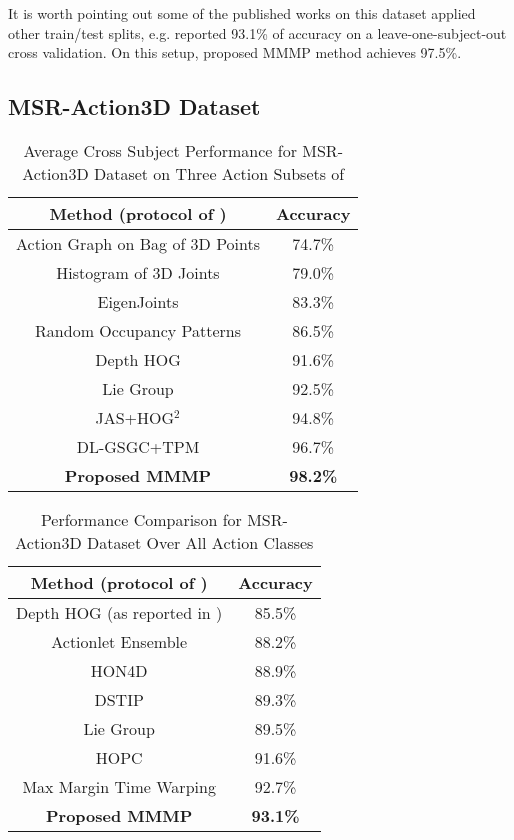 \documentclass[9pt,technote,compsoc]{IEEEtran}
\begin{document}
It is worth pointing out some of the published works on this dataset applied other train/test splits, e.g. \cite{AlthloothiPR} reported 93.1\% of accuracy on a leave-one-subject-out cross validation. On this setup, proposed MMMP method achieves 97.5\%.



\subsection{MSR-Action3D Dataset}
\begin{table}[!t]
	\renewcommand{\arraystretch}{1.3}
	\caption{Average Cross Subject Performance for MSR-Action3D Dataset on Three Action Subsets of \cite{msraction3ddataset}}
	\label{table_msraction3dT1}
	\centering
	\begin{tabular}{|c||c|}
		\hline
		\bfseries Method (protocol of \cite{msraction3ddataset}) & \bfseries Accuracy\\
		\hline
		\hline Action Graph on Bag of 3D Points \cite{msraction3ddataset} & 74.7\%\\
		\hline Histogram of 3D Joints \cite{HOJ3D} & 79.0\%\\
		\hline EigenJoints \cite{eigenjointsJournal} & 83.3\%\\
		\hline Random Occupancy Patterns \cite{wangECCV12robust} & 86.5\%\\
		\hline Depth HOG \cite{DHOG} & 91.6\%\\
		\hline Lie Group \cite{VemulapalliCVPR14} & 92.5\%\\
		\hline JAS+HOG$^2$ \cite{hog2-ohnbar} & 94.8\%\\
		\hline DL-GSGC+TPM \cite{Luo_2013_ICCV} & 96.7\%\\
		\hline\hline
		{\bf Proposed MMMP} & {\bf 98.2\%}\\
		\hline
	\end{tabular}
\end{table}

\begin{table}[!t]
	\renewcommand{\arraystretch}{1.3}
	\caption{Performance Comparison for MSR-Action3D Dataset Over All Action Classes}
	\label{table_msraction3dT2}
	\centering
	\begin{tabular}{|c||c|}
		\hline
		\bfseries Method (protocol of \cite{actionletPAMI})& \bfseries Accuracy\\
		\hline
		\hline Depth HOG \cite{DHOG} (as reported in \cite{MMTW}) & 85.5\%\\
		\hline Actionlet Ensemble \cite{actionletPAMI} & 88.2\%\\
		\hline HON4D \cite{HON4D} & 88.9\%\\
		\hline DSTIP \cite{xiaCVPR13spatio} & 89.3\%\\
		\hline Lie Group \cite{VemulapalliCVPR14} & 89.5\%\\
		\hline HOPC \cite{HOPC} & 91.6\%\\
		\hline Max Margin Time Warping \cite{MMTW} & 92.7\%\\
		\hline 
		\hline
		{\bf Proposed MMMP} & {\bf 93.1\%}\\
		\hline
	\end{tabular}
\end{table}
\end{document}

